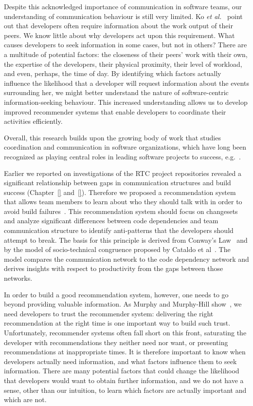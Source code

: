 Despite this acknowledged importance of communication in software teams, our understanding of communication behaviour is still very limited. Ko \emph{et al.}~\cite{ko:icse:2007} point out that developers often require information about the work output of their peers.  We know little about why developers act upon this requirement. What causes developers to seek information in some cases, but not in others? There are a multitude of potential factors: the closeness of their peers' work with their own, the expertise of the developers, their physical proximity, their level of workload, and even, perhaps, the time of day. By identifying which factors actually influence the likelihood that a developer will request information about the events surrounding her, we might better understand the nature of software-centric information-seeking behaviour. This increased understanding allows us to develop improved recommender systems that enable developers to coordinate their activities efficiently.

Overall, this research builds upon the growing body of work that studies coordination and communication in software organizations, which have long been recognized as playing central roles in leading software projects to success, e.g.~\cite{kraut:1995coordination,curtis:acm:1988}.  

Earlier we reported on investigations of the RTC project repositories revealed a significant relationship between gaps in communication structures and build success (Chapter~\ref{} and~\ref{}). Therefore we proposed a recommendation system that allows team members to learn about who they should talk with in order to avoid build failures~\cite{schroeter:rsse:2008}. This recommendation system should focus on changesets and analyze significant differences between code dependencies and team communication structure to identify anti-patterns that the developers should attempt to break.
The basis for this principle is derived from Conway's Law~\cite{conway:datamination:1968} and by the model of socio-technical congruence proposed by Cataldo et al~\cite{cataldo:cscw:2006,cataldo:esem:2008}.
The model compares the communication network to the code dependency network and derives insights with respect to productivity from the gaps between those networks.

In order to build a good recommendation system, however, one needs to go beyond providing valuable information. As Murphy and Murphy-Hill show~\cite{murphy:rsse:2010}, we need developers to trust the recommender system: delivering the right recommendation at the right time is one important way to build such trust. Unfortunately, recommender systems often fall short on this front, saturating the developer with recommendations they neither need nor want, or presenting recommendations at inappropriate times. It is therefore important to know when developers actually need information, and what factors influence them to seek information. There are many potential factors that could change the likelihood that developers would want to obtain further information, and we do not have a sense, other than our intuition, to learn which factors are actually important and which are not.

